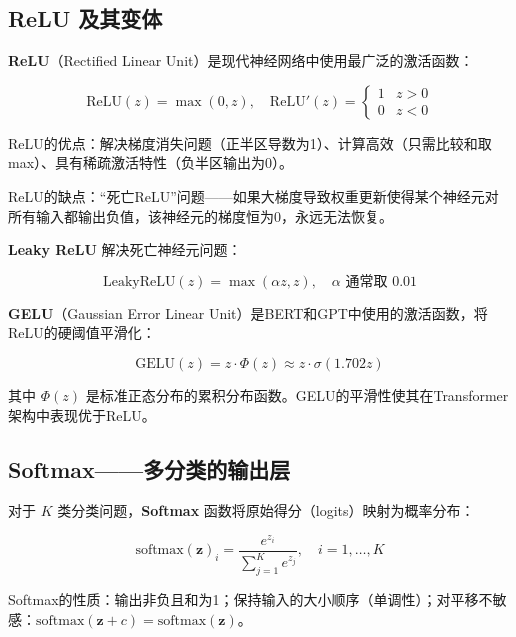 \subsection{ReLU 及其变体}

\textbf{ReLU}（Rectified Linear Unit）是现代神经网络中使用最广泛的激活函数：

\[
\text{ReLU}(z) = \max(0, z), \quad \text{ReLU}'(z) = \begin{cases} 1 & z > 0 \\ 0 & z < 0 \end{cases}
\]

ReLU的优点：解决梯度消失问题（正半区导数为1）、计算高效（只需比较和取max）、具有稀疏激活特性（负半区输出为0）。

ReLU的缺点：``死亡ReLU''问题——如果大梯度导致权重更新使得某个神经元对所有输入都输出负值，该神经元的梯度恒为0，永远无法恢复。

\textbf{Leaky ReLU} 解决死亡神经元问题：

\[
\text{LeakyReLU}(z) = \max(\alpha z, z), \quad \alpha \text{ 通常取 } 0.01
\]

\textbf{GELU}（Gaussian Error Linear Unit）是BERT和GPT中使用的激活函数，将ReLU的硬阈值平滑化：

\[
\text{GELU}(z) = z \cdot \Phi(z) \approx z \cdot \sigma(1.702z)
\]

其中 $\Phi(z)$ 是标准正态分布的累积分布函数。GELU的平滑性使其在Transformer架构中表现优于ReLU。

\subsection{Softmax——多分类的输出层}

对于 $K$ 类分类问题，\textbf{Softmax} 函数将原始得分（logits）映射为概率分布：

\[
\text{softmax}(\mathbf{z})_i = \frac{e^{z_i}}{\sum_{j=1}^{K} e^{z_j}}, \quad i=1,\dots,K
\]

Softmax的性质：输出非负且和为1；保持输入的大小顺序（单调性）；对平移不敏感：$\text{softmax}(\mathbf{z} + c) = \text{softmax}(\mathbf{z})$。

